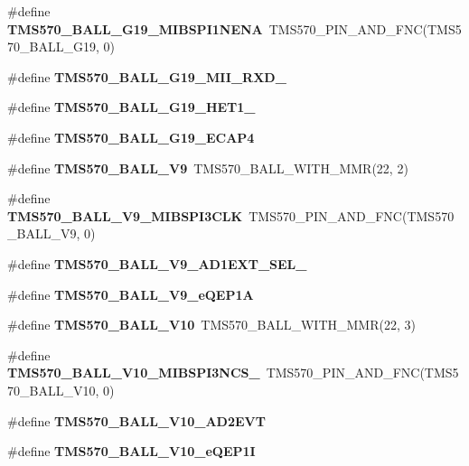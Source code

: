 \begin{DoxyCompactItemize}
\mbox{\label{tms570lc4357-pins_8h_a652b254334340b2a5775ec5a6aa90f19}} 
\#define {\bfseries T\+M\+S570\+\_\+\+B\+A\+L\+L\+\_\+\+G19\+\_\+\+M\+I\+B\+S\+P\+I1\+N\+E\+NA}~T\+M\+S570\+\_\+\+P\+I\+N\+\_\+\+A\+N\+D\+\_\+\+F\+NC(T\+M\+S570\+\_\+\+B\+A\+L\+L\+\_\+\+G19, 0)
\item 
\#define {\bfseries T\+M\+S570\+\_\+\+B\+A\+L\+L\+\_\+\+G19\+\_\+\+M\+I\+I\+\_\+\+R\+X\+D\+\_}
\item 
\#define {\bfseries T\+M\+S570\+\_\+\+B\+A\+L\+L\+\_\+\+G19\+\_\+\+H\+E\+T1\+\_}
\item 
\#define {\bfseries T\+M\+S570\+\_\+\+B\+A\+L\+L\+\_\+\+G19\+\_\+\+E\+C\+A\+P4}
\item 
\mbox{\label{tms570lc4357-pins_8h_af28e43a21bf641aacd721af711504bdb}} 
\#define {\bfseries T\+M\+S570\+\_\+\+B\+A\+L\+L\+\_\+\+V9}~T\+M\+S570\+\_\+\+B\+A\+L\+L\+\_\+\+W\+I\+T\+H\+\_\+\+M\+MR(22, 2)
\item 
\mbox{\label{tms570lc4357-pins_8h_aada3a43594d36548c95b4b3e5f6be452}} 
\#define {\bfseries T\+M\+S570\+\_\+\+B\+A\+L\+L\+\_\+\+V9\+\_\+\+M\+I\+B\+S\+P\+I3\+C\+LK}~T\+M\+S570\+\_\+\+P\+I\+N\+\_\+\+A\+N\+D\+\_\+\+F\+NC(T\+M\+S570\+\_\+\+B\+A\+L\+L\+\_\+\+V9, 0)
\item 
\#define {\bfseries T\+M\+S570\+\_\+\+B\+A\+L\+L\+\_\+\+V9\+\_\+\+A\+D1\+E\+X\+T\+\_\+\+S\+E\+L\+\_}
\item 
\#define {\bfseries T\+M\+S570\+\_\+\+B\+A\+L\+L\+\_\+\+V9\+\_\+e\+Q\+E\+P1A}
\item 
\mbox{\label{tms570lc4357-pins_8h_aa215acb293508e5f131a4957577d14a6}} 
\#define {\bfseries T\+M\+S570\+\_\+\+B\+A\+L\+L\+\_\+\+V10}~T\+M\+S570\+\_\+\+B\+A\+L\+L\+\_\+\+W\+I\+T\+H\+\_\+\+M\+MR(22, 3)
\item 
\mbox{\label{tms570lc4357-pins_8h_aa5f3f15154d2351591400b00acced6d7}} 
\#define {\bfseries T\+M\+S570\+\_\+\+B\+A\+L\+L\+\_\+\+V10\+\_\+\+M\+I\+B\+S\+P\+I3\+N\+C\+S\+\_}~T\+M\+S570\+\_\+\+P\+I\+N\+\_\+\+A\+N\+D\+\_\+\+F\+NC(T\+M\+S570\+\_\+\+B\+A\+L\+L\+\_\+\+V10, 0)
\item 
\#define {\bfseries T\+M\+S570\+\_\+\+B\+A\+L\+L\+\_\+\+V10\+\_\+\+A\+D2\+E\+VT}
\item 
\#define {\bfseries T\+M\+S570\+\_\+\+B\+A\+L\+L\+\_\+\+V10\+\_\+e\+Q\+E\+P1I}

\end{DoxyCompactItemize}
